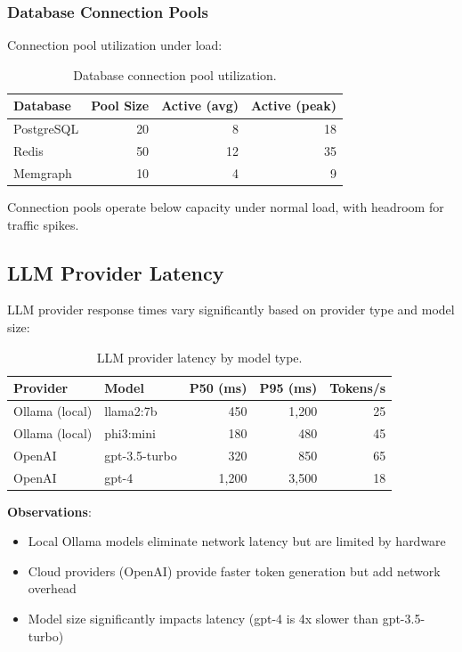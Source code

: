 \subsubsection{Database Connection Pools}

Connection pool utilization under load:

\begin{table}[ht]
\centering
\caption{Database connection pool utilization.}
\label{tab:connection-pools}
\small
\begin{tabular}{lrrr}
\hline
\textbf{Database} & \textbf{Pool Size} & \textbf{Active (avg)} & \textbf{Active (peak)} \\
\hline
PostgreSQL & 20 & 8 & 18 \\
Redis & 50 & 12 & 35 \\
Memgraph & 10 & 4 & 9 \\
\hline
\end{tabular}
\end{table}

Connection pools operate below capacity under normal load, with headroom for traffic spikes.

\subsection{LLM Provider Latency}

LLM provider response times vary significantly based on provider type and model size:

\begin{table}[ht]
\centering
\caption{LLM provider latency by model type.}
\label{tab:llm-latency}
\small
\begin{tabular}{llrrr}
\hline
\textbf{Provider} & \textbf{Model} & \textbf{P50 (ms)} & \textbf{P95 (ms)} & \textbf{Tokens/s} \\
\hline
Ollama (local) & llama2:7b & 450 & 1,200 & 25 \\
Ollama (local) & phi3:mini & 180 & 480 & 45 \\
OpenAI & gpt-3.5-turbo & 320 & 850 & 65 \\
OpenAI & gpt-4 & 1,200 & 3,500 & 18 \\
\hline
\end{tabular}
\end{table}

\textbf{Observations}:
\begin{itemize}
    \item Local Ollama models eliminate network latency but are limited by hardware
    \item Cloud providers (OpenAI) provide faster token generation but add network overhead
    \item Model size significantly impacts latency (gpt-4 is 4x slower than gpt-3.5-turbo)
\end{itemize}

